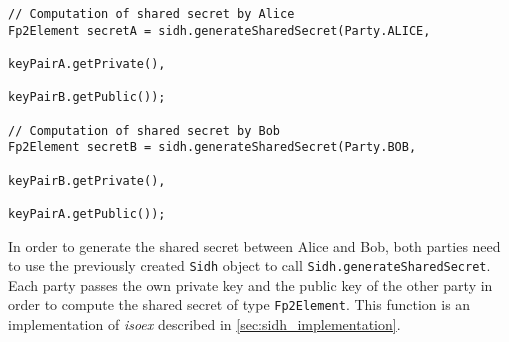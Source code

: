 \begin{lstlisting}[]
// Computation of shared secret by Alice
Fp2Element secretA = sidh.generateSharedSecret(Party.ALICE,
													keyPairA.getPrivate(), 
													keyPairB.getPublic());

// Computation of shared secret by Bob
Fp2Element secretB = sidh.generateSharedSecret(Party.BOB, 
													keyPairB.getPrivate(), 
													keyPairA.getPublic());
\end{lstlisting}
In order to generate the shared secret between Alice and Bob, both parties need to use the previously created \texttt{Sidh} object to call \texttt{Sidh.generateSharedSecret}. Each party passes the own private key and the public key of the other party in order to compute the shared secret of type \texttt{Fp2Element}. This function is an implementation of \textit{isoex} described in \autoref{sec:sidh_implementation}.\\

